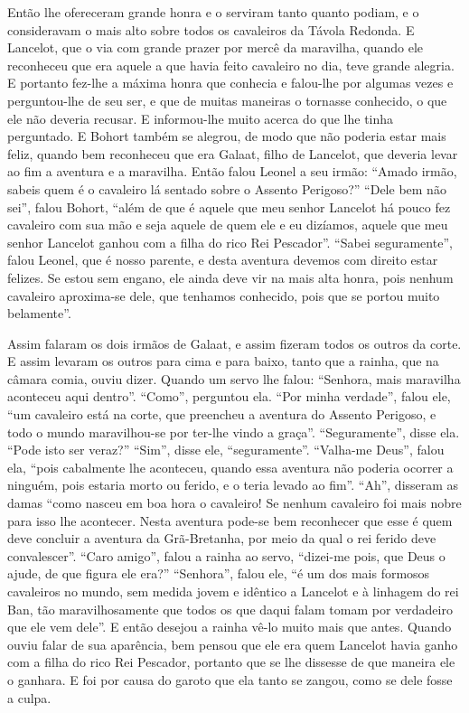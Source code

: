 Então lhe ofereceram grande honra e o serviram tanto quanto podiam, e o
consideravam o mais alto sobre todos os cavaleiros da Távola Redonda. E
Lancelot, que o via com grande prazer por mercê da maravilha, quando ele
reconheceu que era aquele a que havia feito cavaleiro no dia, teve grande
alegria. E portanto fez-lhe  a máxima honra que conhecia e falou-lhe por
algumas vezes e perguntou-lhe de seu ser, e que de muitas maneiras o tornasse
conhecido, o que ele não deveria recusar. E informou-lhe muito acerca do que
lhe tinha perguntado. E Bohort também se alegrou, de modo que não poderia estar
mais feliz, quando bem reconheceu que era Galaat, filho de Lancelot, que
deveria levar ao fim a aventura e a maravilha. Então falou Leonel a seu irmão:
“Amado irmão, sabeis quem é o cavaleiro lá sentado sobre o Assento Perigoso?”
“Dele bem não sei”, falou Bohort, “além de que é aquele que meu senhor
Lancelot há pouco fez cavaleiro com sua mão e seja aquele de quem ele e eu
dizíamos, aquele que meu senhor Lancelot ganhou com a filha do rico Rei
Pescador”. “Sabei seguramente”, falou Leonel, que é nosso parente, e desta
aventura devemos com direito estar felizes.  Se estou sem engano, ele ainda
deve vir na mais alta honra, pois nenhum cavaleiro aproxima-se dele, que
tenhamos conhecido, pois que se portou muito belamente”. 

Assim falaram os dois irmãos de Galaat, e assim fizeram todos os outros da
corte. E assim levaram os outros para cima e para baixo, tanto que a rainha,
que na câmara comia, ouviu dizer. Quando um servo lhe falou: “Senhora, mais
maravilha aconteceu aqui dentro”. “Como”, perguntou ela. “Por minha verdade”,
falou ele, “um cavaleiro está na corte, que preencheu a aventura do Assento
Perigoso, e todo o mundo maravilhou-se por ter-lhe vindo a graça”.
“Seguramente”, disse ela. “Pode isto ser veraz?” “Sim”, disse ele,
“seguramente”. “Valha-me Deus”, falou ela, “pois cabalmente lhe aconteceu,
quando essa aventura não poderia ocorrer a ninguém, pois estaria morto ou
ferido, e o teria levado ao fim”. “Ah”, disseram as damas “como nasceu em boa
hora o cavaleiro! Se nenhum cavaleiro foi mais nobre para isso lhe acontecer.
Nesta aventura pode-se bem reconhecer que esse é quem deve concluir a aventura
da Grã-Bretanha, por meio da qual o rei ferido deve convalescer”. “Caro
amigo”, falou a rainha ao servo, “dizei-me pois, que Deus o ajude, de que
figura ele era?” “Senhora”, falou ele, “é um dos mais formosos cavaleiros no
mundo, sem medida jovem e idêntico a Lancelot e à linhagem do rei Ban, tão
maravilhosamente que todos os que daqui falam tomam por verdadeiro que ele vem
dele”. E então desejou a rainha vê-lo muito mais que antes. Quando ouviu falar
de sua aparência, bem pensou que ele era quem Lancelot havia ganho com a filha
do rico Rei Pescador, portanto que se lhe dissesse de que maneira ele o
ganhara. E foi por causa do garoto que ela tanto se zangou, como se dele fosse
a culpa. 

